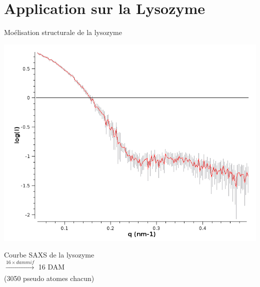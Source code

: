 \documentclass{beamer}
\begin{document}
\section{Application sur la Lysozyme}

\begin{frame}{Mo\'elisation structurale de la lysozyme}

\begin{minipage}{0.40\linewidth}
    \begin{flushleft}
    \includegraphics[scale=0.2]{saxscurve.png}
    \end{flushleft}
\end{minipage} \hfill
\begin{minipage}{0.55\linewidth}
  Courbe SAXS de la lysozyme\\ 
  $\xrightarrow[]{16 \times dammif}$ 16 DAM\\
  (3050 pseudo atomes chacun)
\end{minipage}




\end{frame}
\end{document}
